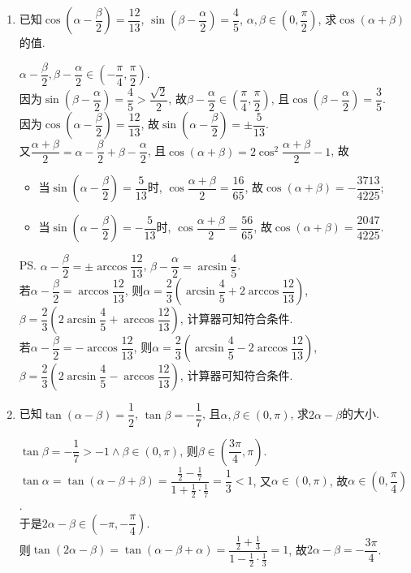 \begin{enumerate}
\item 已知$\cos\left(\alpha-\dfrac{\beta}{2}\right)=\dfrac{12}{13}$, $\sin\left(\beta-\dfrac{\alpha}{2}\right)=\dfrac{4}{5}$, 
$\alpha,\beta\in\left(0,\dfrac{\pi}{2}\right)$, 求$\cos(\alpha+\beta)$的值. 
\begin{jieda}
$\alpha-\dfrac{\beta}{2},\beta-\dfrac{\alpha}{2}\in\left(-\dfrac{\pi}{4},\dfrac{\pi}{2}\right)$. \\
因为$\sin\left(\beta-\dfrac{\alpha}{2}\right)=\dfrac{4}{5}>\dfrac{\sqrt{2}}{2}$, 故$\beta-\dfrac{\alpha}{2}\in\left(\dfrac{\pi}{4},\dfrac{\pi}{2}\right)$, 
且$\cos\left(\beta-\dfrac{\alpha}{2}\right)=\dfrac{3}{5}$. \\
因为$\cos\left(\alpha-\dfrac{\beta}{2}\right)=\dfrac{12}{13}$, 故$\sin\left(\alpha-\dfrac{\beta}{2}\right)=\pm\dfrac{5}{13}$. \\
又$\dfrac{\alpha+\beta}{2}=\alpha-\dfrac{\beta}{2}+\beta-\dfrac{\alpha}{2}$, 且$\cos(\alpha+\beta)=2\cos^2\dfrac{\alpha+\beta}{2}-1$, 故
\begin{itemize}
\item 当$\sin\left(\alpha-\dfrac{\beta}{2}\right)=\dfrac{5}{13}$时, $\cos\dfrac{\alpha+\beta}{2}=\dfrac{16}{65}$, 故$\cos(\alpha+\beta)=-\dfrac{3713}{4225}$; 
\item 当$\sin\left(\alpha-\dfrac{\beta}{2}\right)=-\dfrac{5}{13}$时, $\cos\dfrac{\alpha+\beta}{2}=\dfrac{56}{65}$, 故$\cos(\alpha+\beta)=\dfrac{2047}{4225}$. 
\end{itemize}
\ps $\alpha-\dfrac{\beta}{2}=\pm\arccos\dfrac{12}{13}$, $\beta-\dfrac{\alpha}{2}=\arcsin\dfrac{4}{5}$. \\
若$\alpha-\dfrac{\beta}{2}=\arccos\dfrac{12}{13}$, 
则$\alpha=\dfrac{2}{3}\left(\arcsin\dfrac{4}{5}+2\arccos\dfrac{12}{13}\right)$, 
$\beta=\dfrac{2}{3}\left(2\arcsin\dfrac{4}{5}+\arccos\dfrac{12}{13}\right)$, 计算器可知符合条件. \\
若$\alpha-\dfrac{\beta}{2}=-\arccos\dfrac{12}{13}$, 
则$\alpha=\dfrac{2}{3}\left(\arcsin\dfrac{4}{5}-2\arccos\dfrac{12}{13}\right)$, 
$\beta=\dfrac{2}{3}\left(2\arcsin\dfrac{4}{5}-\arccos\dfrac{12}{13}\right)$, 计算器可知符合条件. 
\end{jieda}

\item 已知$\tan(\alpha-\beta)=\dfrac{1}{2}$, $\tan\beta=-\dfrac{1}{7}$, 且$\alpha,\beta\in(0,\pi)$, 求$2\alpha-\beta$的大小. 
\begin{jieda}
$\tan\beta=-\dfrac{1}{7}>-1\land\beta\in(0,\pi)$, 则$\beta\in\left(\dfrac{3\pi}{4},\pi\right)$. \\
$\tan\alpha=\tan(\alpha-\beta+\beta)=\dfrac{\frac{1}{2}-\frac{1}{7}}{1+\frac{1}{2}\cdot\frac{1}{7}}=\dfrac{1}{3}<1$, 
又$\alpha\in(0,\pi)$, 故$\alpha\in\left(0,\dfrac{\pi}{4}\right)$. \\
于是$2\alpha-\beta\in\left(-\pi,-\dfrac{\pi}{4}\right)$. \\
则$\tan(2\alpha-\beta)=\tan(\alpha-\beta+\alpha)=\dfrac{\frac{1}{2}+\frac{1}{3}}{1-\frac{1}{2}\cdot\frac{1}{3}}=1$, 
故$2\alpha-\beta=-\dfrac{3\pi}{4}$. 
\end{jieda}



\end{enumerate}

